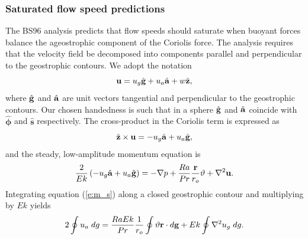 \subsubsection*{Saturated flow speed predictions}
 The BS96 analysis predicts that flow speeds should saturate when buoyant forces balance the ageostrophic component of the Coriolis force. 
 The analysis requires that the velocity field be decomposed into components parallel and perpendicular to the geostrophic contours.
 We adopt the notation
\begin{equation}
	\mathbf{u} = u_{{g}}{\hat{\mathbf{g}}} + u_{{a}}{\hat{\mathbf{a}}} + w \hat{\mathbf{z}},
	\label{e:geo_dec}
\end{equation}
where ${\hat{\mathbf{g}}}$ and ${\hat{\mathbf{a}}}$ are unit vectors tangential and perpendicular to the geostrophic contours. Our chosen handedness is such that in a sphere ${\hat{\mathbf{g}}}$ and ${\hat{\mathbf{a}}} $ coincide with $\hat{\boldsymbol{\phi}}$ and $\hat{\mathbf{s}}$ respectively. 
The cross-product in the Coriolis term is expressed as
\[\hat{\mathbf{z}}\times\mathbf{u} = -u_{{g}}{\hat{\mathbf{a}}} + u_{{a}}{\hat{\mathbf{g}}},\]
and the steady, low-amplitude momentum equation is
\begin{equation}
	\frac{2}{Ek}\left ( -u_{{g}}{\hat{\mathbf{a}}} + u_{{a}}{\hat{\mathbf{g}}}\right )   = - \nabla p + \frac{Ra}{Pr} \frac{\mathbf{r}}{r_{o}} \vartheta + \nabla^{2}\mathbf{u}. 
	\label{e:m_s}
\end{equation}
Integrating equation (\ref{e:m_s}) along a closed geostrophic contour and multiplying by $Ek$ yields
\begin{equation}
2\oint u_{{a}}\;d{g} =\frac{Ra Ek}{Pr}\frac{1}{r_{o}}\oint \vartheta \mathbf{r} \cdot d\mathbf{{g}} 
+ Ek\oint \nabla^{2}u_{{g}}\;d{g}.
\label{e:m_avg}
\end{equation}

